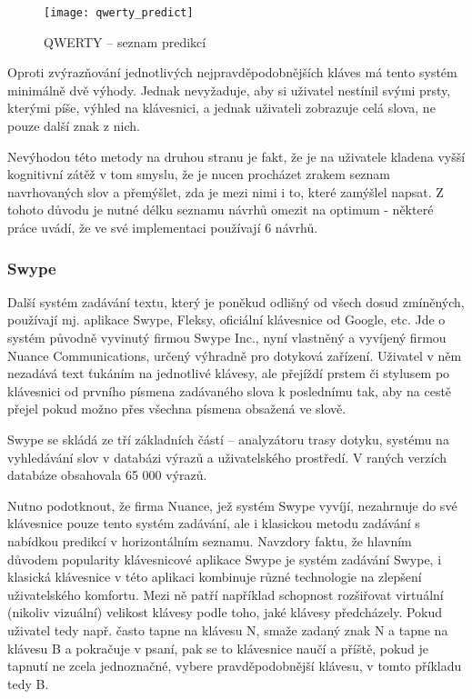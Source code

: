 \documentclass[a4paper,11pt]{article}
\newcommand{\td}[2][]{
	{\todo[size=\footnotesize]{#2}}
}
\begin{document}
\begin{figure}[ht]
	\centering
	\texttt{[image: qwerty\_predict]}
	\caption{QWERTY -- seznam predikcí}
	\label{fig:qwerty-predict}
\end{figure}

Oproti zvýrazňování jednotlivých nejpravděpodobnějších kláves má tento systém minimálně dvě výhody. Jednak nevyžaduje, aby si uživatel nestínil svými prsty, kterými píše, výhled na klávesnici, a jednak uživateli zobrazuje celá slova, ne pouze další znak z nich. %

Nevýhodou této metody na druhou stranu je fakt, že je na uživatele kladena vyšší kognitivní zátěž v tom smyslu, že je nucen procházet zrakem seznam navrhovaných slov a přemýšlet, zda je mezi nimi i to, které zamýšlel napsat. Z tohoto důvodu je nutné délku seznamu návrhů omezit na optimum - některé práce uvádí, že ve své implementaci používají 6 návrhů.

\subsubsection{Swype}

Další systém zadávání textu, který je poněkud odlišný od všech dosud zmíněných, používají mj. aplikace Swype, Fleksy, oficiální klávesnice od Google, etc. Jde o systém původně vyvinutý firmou Swype Inc., nyní vlastněný a vyvíjený firmou Nuance Communications, určený výhradně pro dotyková zařízení. Uživatel v něm nezadává text ťukáním na jednotlivé klávesy, ale přejíždí prstem či stylusem po klávesnici od prvního písmena zadávaného slova k poslednímu tak, aby na cestě přejel pokud možno přes všechna písmena obsažená ve slově. %

Swype se skládá ze tří základních částí -- analyzátoru trasy dotyku, systému na vyhledávání slov v databázi výrazů a uživatelského prostředí. V raných verzích databáze obsahovala\td{damn.. tady mi zase utekla citace nekam do haje} 65 000 výrazů.

Nutno podotknout, že firma Nuance, jež systém Swype vyvíjí, nezahrnuje do své klávesnice pouze tento systém zadávání, ale i klasickou metodu zadávání s nabídkou predikcí v horizontálním seznamu. Navzdory faktu, že hlavním důvodem popularity klávesnicové aplikace Swype je systém zadávání Swype, i klasická klávesnice v této aplikaci kombinuje různé technologie na zlepšení uživatelského komfortu. Mezi ně patří například schopnost rozšiřovat virtuální (nikoliv vizuální) velikost klávesy podle toho, jaké klávesy předcházely. Pokud uživatel tedy např. často tapne na klávesu N, smaže zadaný znak N a tapne na klávesu B a pokračuje v psaní, pak se to klávesnice naučí a příště, pokud je tapnutí ne zcela jednoznačné, vybere pravděpodobnější klávesu, v tomto příkladu tedy B. %
\end{document}
